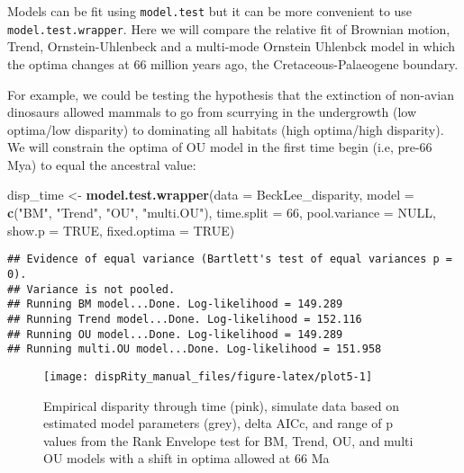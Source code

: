 \documentclass[
]{book}
\newenvironment{Shaded}{\begin{snugshade}}{\end{snugshade}}
\newcommand{\DataTypeTok}[1]{\textcolor[rgb]{0.13,0.29,0.53}{#1}}
\newcommand{\DecValTok}[1]{\textcolor[rgb]{0.00,0.00,0.81}{#1}}
\newcommand{\KeywordTok}[1]{\textcolor[rgb]{0.13,0.29,0.53}{\textbf{#1}}}
\newcommand{\NormalTok}[1]{#1}
\newcommand{\OtherTok}[1]{\textcolor[rgb]{0.56,0.35,0.01}{#1}}
\newcommand{\StringTok}[1]{\textcolor[rgb]{0.31,0.60,0.02}{#1}}
\begin{document}
Models can be fit using \texttt{model.test} but it can be more convenient to use \texttt{model.test.wrapper}.
Here we will compare the relative fit of Brownian motion, Trend, Ornstein-Uhlenbeck and a multi-mode Ornstein Uhlenbck model in which the optima changes at 66 million years ago, the Cretaceous-Palaeogene boundary.

For example, we could be testing the hypothesis that the extinction of non-avian dinosaurs allowed mammals to go from scurrying in the undergrowth (low optima/low disparity) to dominating all habitats (high optima/high disparity).
We will constrain the optima of OU model in the first time begin (i.e, pre-66 Mya) to equal the ancestral value:

\begin{Shaded}
\begin{Highlighting}[]
\NormalTok{disp\_time \textless{}{-}}\StringTok{ }\KeywordTok{model.test.wrapper}\NormalTok{(}\DataTypeTok{data =}\NormalTok{ BeckLee\_disparity,}
                        \DataTypeTok{model =} \KeywordTok{c}\NormalTok{(}\StringTok{"BM"}\NormalTok{, }\StringTok{"Trend"}\NormalTok{, }\StringTok{"OU"}\NormalTok{, }\StringTok{"multi.OU"}\NormalTok{),}
                                \DataTypeTok{time.split =} \DecValTok{66}\NormalTok{,}
                                \DataTypeTok{pool.variance =} \OtherTok{NULL}\NormalTok{,}
                                \DataTypeTok{show.p =} \OtherTok{TRUE}\NormalTok{,}
                                \DataTypeTok{fixed.optima =} \OtherTok{TRUE}\NormalTok{)}
\end{Highlighting}
\end{Shaded}

\begin{verbatim}
## Evidence of equal variance (Bartlett's test of equal variances p = 0).
## Variance is not pooled.
## Running BM model...Done. Log-likelihood = 149.289
## Running Trend model...Done. Log-likelihood = 152.116
## Running OU model...Done. Log-likelihood = 149.289
## Running multi.OU model...Done. Log-likelihood = 151.958
\end{verbatim}

\begin{figure}

{\centering \texttt{[image: dispRity\_manual\_files/figure-latex/plot5-1]} 

}

\caption{Empirical disparity through time (pink), simulate data based on estimated model parameters (grey), delta AICc, and range of p values from the Rank Envelope test for BM, Trend, OU, and multi OU models with a shift in optima allowed at 66 Ma}\label{fig:plot5}
\end{figure}
\end{document}

